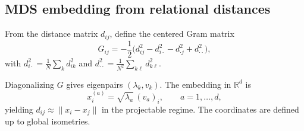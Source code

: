 \subsection{MDS embedding from relational distances}
  \label{subsec:mds-embedding-from-relational-distances}

  From the distance matrix $d_{ij}$, define the centered Gram matrix
  \begin{equation}
    G_{ij}
    =
    -\frac{1}{2}
    \big(d_{ij}^2 - d_{i\cdot}^2 - d_{\cdot j}^2 + d_{\cdot\cdot}^2\big),
    \label{eq:gram-matrix}
  \end{equation}
  with $d_{i\cdot}^2=\frac{1}{N}\sum_k d_{ik}^2$ and
  $d_{\cdot\cdot}^2=\frac{1}{N^2}\sum_{k\ell} d_{k\ell}^2$.

  Diagonalizing $G$ gives eigenpairs $(\lambda_k, v_k)$.
  The embedding in $\mathbb{R}^d$ is
  \begin{equation}
    x_i^{(a)} = \sqrt{\lambda_a}\,(v_a)_i,
    \qquad a=1,\dots,d,
    \label{eq:mds-embedding}
  \end{equation}
  yielding $d_{ij}\approx \|x_i-x_j\|$ in the projectable regime.
  The coordinates are defined up to global isometries.
